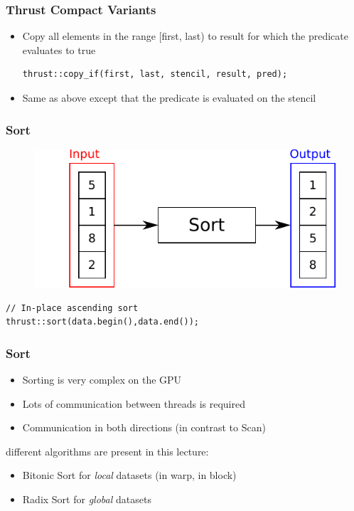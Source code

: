 \documentclass[aspectratio=169,handout]{beamer}
\begin{document}
\begin{frame}[fragile]
\frametitle{Thrust Compact Variants}

\begin{itemize}
\begin{lstlisting}
thrust::copy_if(first, last, result, pred);		
\end{lstlisting}
	\item Copy all elements in the range [first, last) to result for which the predicate evaluates to true
\begin{lstlisting}
thrust::copy_if(first, last, stencil, result, pred);		
\end{lstlisting}
\item Same as above except that the predicate is evaluated on the stencil
\end{itemize}
\end{frame}


\begin{frame}[fragile]
\frametitle{Sort}
\begin{figure}
	\centering
	\includegraphics[height=0.6\textheight]{o_sort}
\end{figure}

\begin{lstlisting}
// In-place ascending sort
thrust::sort(data.begin(),data.end());
\end{lstlisting}
\end{frame}

\frame
{
	\frametitle{Sort}
	\begin{itemize}
		\item Sorting is very complex on the GPU
		\item<2-> Lots of communication between threads is required
		\item<2-> Communication in both directions (in contrast to Scan)
	\end{itemize}
 different algorithms are present in this lecture:
\begin{itemize}
	\item<4-> Bitonic Sort for \textit{local} datasets (in warp, in block)
	\item<5-> Radix Sort for \textit{global} datasets
\end{itemize}
}
\end{document}

